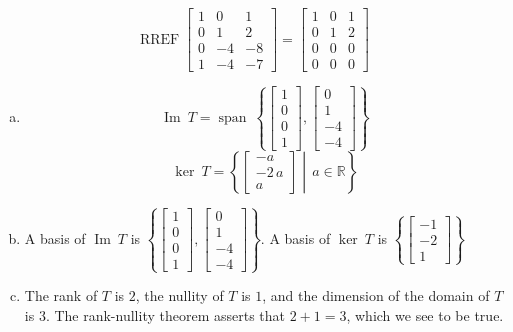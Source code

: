 \begin{exerciseAnswer} 


\[\operatorname{RREF} \left[\begin{array}{ccc}
1 & 0 & 1 \\
0 & 1 & 2 \\
0 & -4 & -8 \\
1 & -4 & -7
\end{array}\right] = \left[\begin{array}{ccc}
1 & 0 & 1 \\
0 & 1 & 2 \\
0 & 0 & 0 \\
0 & 0 & 0
\end{array}\right] \]


\begin{enumerate}[(a)]
\item \[\operatorname{Im}\ T = \operatorname{span}\  \left\{ \left[\begin{array}{c}
1 \\
0 \\
0 \\
1
\end{array}\right] , \left[\begin{array}{c}
0 \\
1 \\
-4 \\
-4
\end{array}\right] \right\} \]\[\operatorname{ker}\ T =  \left\{ \left[\begin{array}{c}
-a \\
-2 \, a \\
a
\end{array}\right] \middle|\,a\in\mathbb{R}\right\} \]
\item  A basis of \(\operatorname{Im}\ T\) is \( \left\{ \left[\begin{array}{c}
1 \\
0 \\
0 \\
1
\end{array}\right] , \left[\begin{array}{c}
0 \\
1 \\
-4 \\
-4
\end{array}\right] \right\} \). A basis of \(\operatorname{ker}\ T\) is \( \left\{ \left[\begin{array}{c}
-1 \\
-2 \\
1
\end{array}\right] \right\} \)
\item  The rank of \(T\) is \( 2 \), the nullity of \(T\) is \( 1 \), and the dimension of the domain of \(T\) is \( 3 \). The rank-nullity theorem asserts that \( 2 + 1 = 3 \), which we see to be true. 
\end{enumerate}
    
\end{exerciseAnswer}
    
